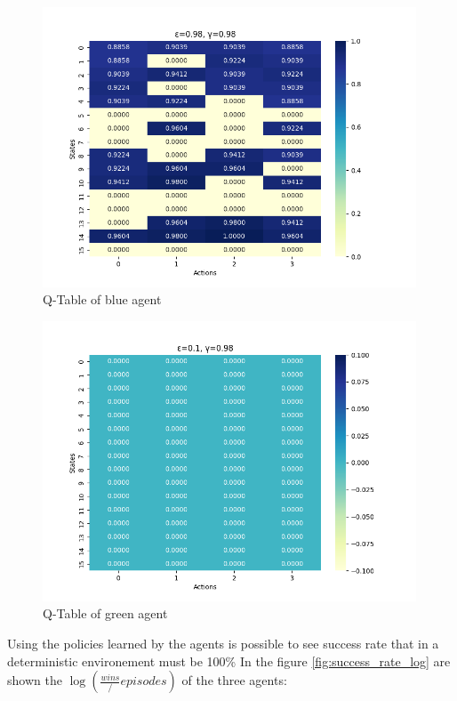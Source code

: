 \begin{figure}[H]
    \centering
    \includegraphics[width=0.99\textwidth]{images/heatmap1.png}
    \caption{Q-Table of blue agent}
    \label{fig:blue_agent}
\end{figure}
\begin{figure}[H]
    \centering
    \includegraphics[width=0.99\textwidth]{images/heatmap3.png}
    \caption{Q-Table of green agent}
    \label{fig:green_agent}
\end{figure}
Using the policies learned by the agents is possible to see success rate that in a deterministic environement must be 100\%
In the figure \ref{fig:success_rate_log} are shown the $\log(\frac{wins}/{episodes})$ of the three agents:
